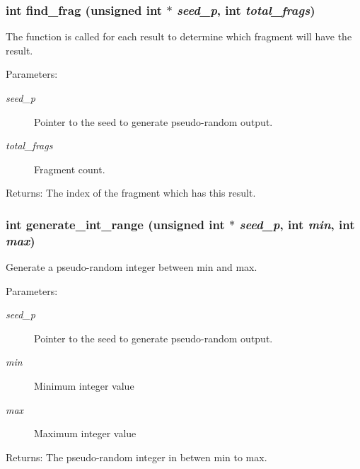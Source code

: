 \subsubsection{\setlength{\rightskip}{0pt plus 5cm}int find\_\-frag (unsigned int $\ast$ {\em seed\_\-p}, int {\em total\_\-frags})}\label{misc_8c_bb65cad3f89913135028e57a4eca0539}


The function is called for each result to determine which fragment will have the result.

\begin{Desc}
\item[Parameters:]
\begin{description}
\item[{\em seed\_\-p}]Pointer to the seed to generate pseudo-random output. \item[{\em total\_\-frags}]Fragment count. \end{description}
\end{Desc}
\begin{Desc}
\item[Returns:]The index of the fragment which has this result. \end{Desc}
\subsubsection{\setlength{\rightskip}{0pt plus 5cm}int generate\_\-int\_\-range (unsigned int $\ast$ {\em seed\_\-p}, int {\em min}, int {\em max})}\label{misc_8c_407a02c8ee44e13abcd5ed333b6c3afe}


Generate a pseudo-random integer between min and max.

\begin{Desc}
\item[Parameters:]
\begin{description}
\item[{\em seed\_\-p}]Pointer to the seed to generate pseudo-random output. \item[{\em min}]Minimum integer value \item[{\em max}]Maximum integer value \end{description}
\end{Desc}
\begin{Desc}
\item[Returns:]The pseudo-random integer in betwen min to max. \end{Desc}
